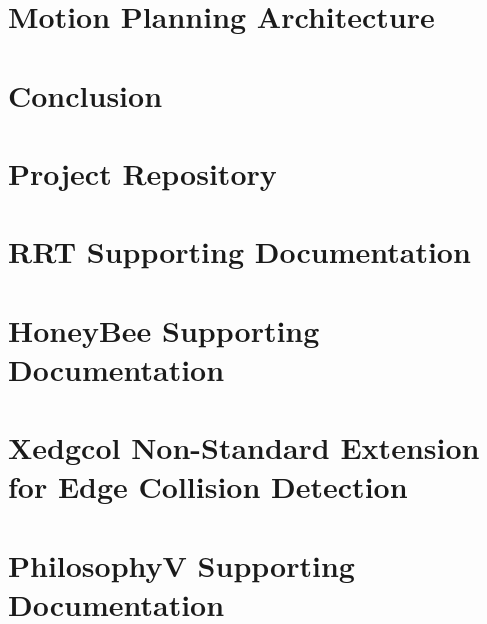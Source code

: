\documentclass[
    11pt,           %
    letterpaper,    %
    draft,          %
    oneside         %
]{report}           %
\begin{document}
\chapter{Motion Planning Architecture}
    \label{chap:MotionPlaningArchitecture}
    

\chapter{Conclusion}
    

\begin{appendices}

\chapter{Project Repository}
    \label{appendix:repository}
    

\chapter{RRT Supporting Documentation}
    \label{appendix:rrt_appendix}
    

\chapter{HoneyBee Supporting Documentation}
    \label{appendix:honeybee_appendix}
    

\chapter{Xedgcol Non-Standard Extension for Edge Collision Detection}
    \label{appendix:xedgcol_appendix}
    

\chapter{PhilosophyV Supporting Documentation}
    \label{appendix:philv_appendix}
    

\end{appendices} 




\clearpage 
\newpage



\listoftodos 
\end{document}
